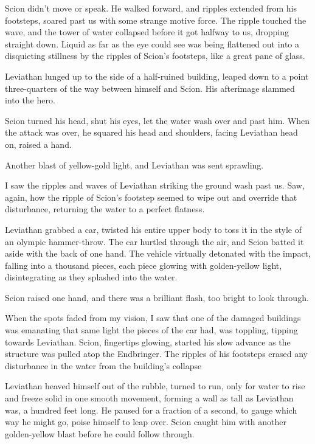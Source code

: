 Scion didn't move or speak.  He walked forward, and ripples extended from his footsteps, soared past us with some strange motive force.  The ripple touched the wave, and the tower of water collapsed before it got halfway to us, dropping straight down.  Liquid as far as the eye could see was being flattened out into a disquieting stillness by the ripples of Scion's footsteps, like a great pane of glass.



Leviathan lunged up to the side of a half-ruined building, leaped down to a point three-quarters of the way between himself and Scion.  His afterimage slammed into the hero.



Scion turned his head, shut his eyes, let the water wash over and past him.  When the attack was over, he squared his head and shoulders, facing Leviathan head on, raised a hand.



Another blast of yellow-gold light, and Leviathan was sent sprawling.



I saw the ripples and waves of Leviathan striking the ground wash past us.  Saw, again, how the ripple of Scion's footstep seemed to wipe out and override that disturbance, returning the water to a perfect flatness.



Leviathan grabbed a car, twisted his entire upper body to toss it in the style of an olympic hammer-throw.  The car hurtled through the air, and Scion batted it aside with the back of one hand.  The vehicle virtually detonated with the impact, falling into a thousand pieces, each piece glowing with golden-yellow light, disintegrating as they splashed into the water.



Scion raised one hand, and there was a brilliant flash, too bright to look through.



When the spots faded from my vision, I saw that one of the damaged buildings was emanating that same light the pieces of the car had, was toppling, tipping towards Leviathan.  Scion, fingertips glowing, started his slow advance as the structure was pulled atop the Endbringer.  The ripples of his footsteps erased any disturbance in the water from the building's collapse



Leviathan heaved himself out of the rubble, turned to run, only for water to rise and freeze solid in one smooth movement, forming a wall as tall as Leviathan was, a hundred feet long.  He paused for a fraction of a second, to gauge which way he might go, poise himself to leap over.  Scion caught him with another golden-yellow blast before he could follow through.



